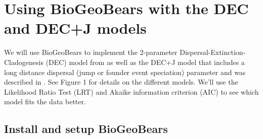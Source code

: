 \documentclass[11pt]{article}
\begin{document}
\section{Using BioGeoBears with the DEC and DEC+J models}

We will use BioGeoBears to implement the
2-parameter Dispersal-Extinction-Cladogenesis (DEC) 
model from \citet{ree2008maximum}
as well as the DEC+J model that includes
a long distance dispersal 
(jump or founder event speciation)
parameter and was described in \citet{matzke2014model}.
See Figure 1 for details on the different models.
We'll use the Likelihood Ratio Test (LRT) and
Akaike information criterion (AIC)
to see which model fits the data better.

\subsection{Install and setup BioGeoBears}
\end{document}
